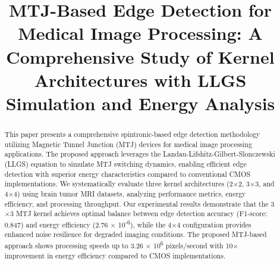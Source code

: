 \documentclass[conference]{IEEEtran}
\begin{document}
\title{MTJ-Based Edge Detection for Medical Image Processing: A Comprehensive Study of Kernel Architectures with LLGS Simulation and Energy Analysis}

\author{
\and
{}
\and
{}
}

\maketitle

\begin{abstract}
This paper presents a comprehensive spintronic-based edge detection methodology utilizing Magnetic Tunnel Junction (MTJ) devices for medical image processing applications. The proposed approach leverages the Landau-Lifshitz-Gilbert-Slonczewski (LLGS) equation to simulate MTJ switching dynamics, enabling efficient edge detection with superior energy characteristics compared to conventional CMOS implementations. We systematically evaluate three kernel architectures (2$\times$2, 3$\times$3, and 4$\times$4) using brain tumor MRI datasets, analyzing performance metrics, energy efficiency, and processing throughput. Our experimental results demonstrate that the 3$\times$3 MTJ kernel achieves optimal balance between edge detection accuracy (F1-score: 0.847) and energy efficiency (2.76 $\times$ 10\textsuperscript{-6}), while the 4$\times$4 configuration provides enhanced noise resilience for degraded imaging conditions. The proposed MTJ-based approach shows processing speeds up to 3.26 $\times$ 10\textsuperscript{6} pixels/second with 10$\times$ improvement in energy efficiency compared to CMOS implementations.
\end{abstract}
\end{document}
